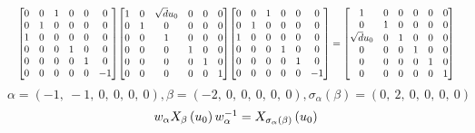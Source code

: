 \documentclass[11pt]{article}
\theoremstyle{definition}
\begin{document}
\[
\scaletoalign{\textwidth}{{\left[\begin{matrix}0 & 0 & 1 & 0 & 0 & 0\\0 & 1 & 0 & 0 & 0 & 0\\1 & 0 & 0 & 0 & 0 & 0\\0 & 0 & 0 & 1 & 0 & 0\\0 & 0 & 0 & 0 & 1 & 0\\0 & 0 & 0 & 0 & 0 & -1\end{matrix}\right]} {\left[\begin{matrix}1 & 0 & \sqrt{d} u_{0} & 0 & 0 & 0\\0 & 1 & 0 & 0 & 0 & 0\\0 & 0 & 1 & 0 & 0 & 0\\0 & 0 & 0 & 1 & 0 & 0\\0 & 0 & 0 & 0 & 1 & 0\\0 & 0 & 0 & 0 & 0 & 1\end{matrix}\right]} {\left[\begin{matrix}0 & 0 & 1 & 0 & 0 & 0\\0 & 1 & 0 & 0 & 0 & 0\\1 & 0 & 0 & 0 & 0 & 0\\0 & 0 & 0 & 1 & 0 & 0\\0 & 0 & 0 & 0 & 1 & 0\\0 & 0 & 0 & 0 & 0 & -1\end{matrix}\right]} = {\left[\begin{matrix}1 & 0 & 0 & 0 & 0 & 0\\0 & 1 & 0 & 0 & 0 & 0\\\sqrt{d} u_{0} & 0 & 1 & 0 & 0 & 0\\0 & 0 & 0 & 1 & 0 & 0\\0 & 0 & 0 & 0 & 1 & 0\\0 & 0 & 0 & 0 & 0 & 1\end{matrix}\right]}}
\]
\[
\alpha = \left( -1, \  -1, \  0, \  0, \  0, \  0\right), \beta = \left( -2, \  0, \  0, \  0, \  0, \  0\right), \sigma_{\alpha}(\beta) = \left( 0, \  2, \  0, \  0, \  0, \  0\right)
\]
\[
\scaletoalign{\textwidth}{w_{\alpha} X_{\beta}\left(u_{0}\right) w_{\alpha}^{-1} = X_{\sigma_{\alpha}\left(\beta\right)}\left(u_{0}\right)}
\]
\end{document}
